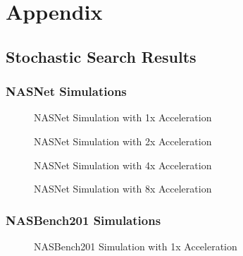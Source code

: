 \documentclass[twocolumn]{article}
\begin{document}
\section{Appendix}

\subsection{Stochastic Search Results}
\subsubsection{NASNet Simulations}

\begin{figure}[!h]
    \begin{center}
        
    \end{center}
    \caption{NASNet Simulation with 1x Acceleration}
    \label{fig:nasnet_1x_acceleration}
\end{figure}

\begin{figure}
    \begin{center}
        
    \end{center}
    \caption{NASNet Simulation with 2x Acceleration}
    \label{fig:nasnet_2x_acceleration}
\end{figure}

\begin{figure}
    \begin{center}
        
    \end{center}
    \caption{NASNet Simulation with 4x Acceleration}
    \label{fig:nasnet_4x_acceleration}
\end{figure}

\begin{figure}
    \begin{center}
        
    \end{center}
    \caption{NASNet Simulation with 8x Acceleration}
    \label{fig:nasnet_8x_acceleration}
\end{figure}

\FloatBarrier
\clearpage
\subsubsection{NASBench201 Simulations}

\begin{figure}[!h]
    \begin{center}
        
    \end{center}
    \caption{NASBench201 Simulation with 1x Acceleration}
    \label{fig:nasbench_1x_acceleration}
\end{figure}
\end{document}
